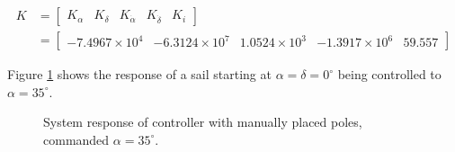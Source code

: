 \documentclass[]{aiaa-tc}%
\begin{document}
\begin{equation}
\begin{aligned}
K &= \begin{bmatrix}
K_{\alpha} & K_{\delta} & K_{\dot{\alpha}} & K_{\dot{\delta}} & K_i
\end{bmatrix}\\ 
 &= \begin{bmatrix}
-7.4967\times10^4 & -6.3124\times10^7 & 1.0524\times10^3 & -1.3917\times10^6 & 59.557
\end{bmatrix}
\end{aligned}
\end{equation}

	Figure  \ref{fig:Controller1} shows the response of a sail starting at $\alpha=\delta=0^{\circ}$ being controlled to $\alpha = 35^{\circ}$.

	\vspace{5 mm}
	
	\begin{figure}[H]
		\centering
		\caption{System response of controller with manually placed poles, commanded $\alpha=35^{\circ}$. }
		\label{fig:Controller1}
	\end{figure}	
\end{document}
